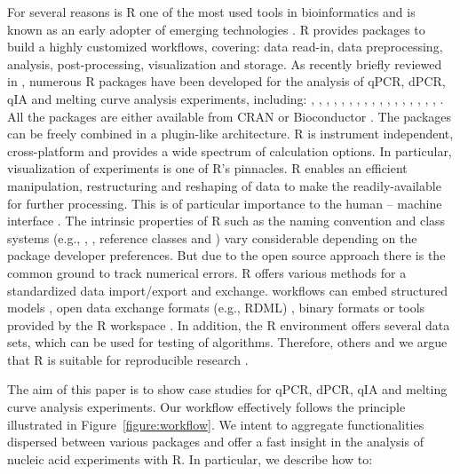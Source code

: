 For several reasons is R one of the most used tools in bioinformatics and is 
known as an early adopter of emerging technologies \citep{pabinger_2014}. R 
provides packages to build a highly customized workflows, covering: data 
read-in, data preprocessing, analysis, post-processing, visualization and 
storage. As recently briefly reviewed in \citet{pabinger_2014}, numerous R 
packages have been developed for the analysis of qPCR, dPCR, qIA and melting 
curve analysis experiments, including: , , 
, , , , 
, , , , 
, , , , 
, , , 
. All the packages are either available from CRAN or 
Bioconductor \citep{gentleman_2004}. The packages can be freely combined in a 
plugin-like architecture. R is instrument independent, cross-platform and 
provides a wide spectrum of calculation options. In particular, visualization of 
experiments is one of R's pinnacles. R enables an 
efficient manipulation, restructuring and reshaping of data to make the 
readily-available for further processing. This is of particular importance to 
the human -- machine interface \citep{Oh_2014}. The intrinsic properties of R 
such as the naming convention \citep{Baaaath_2012} and class systems (e.g., 
, , reference classes and ) vary considerable 
depending on the package developer preferences. But due to the open source 
approach there is the common ground to track numerical errors. R offers various 
methods for a standardized data import/export and exchange. workflows can embed 
structured models \citet{Guazzelli_2009}, open data exchange formats (e.g., RDML) , binary 
formats \citep{michna_2013} or tools provided by the R workspace 
\citep{RDCT2010c}. In addition, the R environment offers several data sets, 
which can be used for testing of algorithms. Therefore, others and we argue that 
R is suitable for reproducible research \citep{Gesmann_2011, Murrell_2012, 
gandrud_2013, hofmann_2013, Leeper_2014, liu_2014}. 

The aim of this paper is to show case studies for qPCR, dPCR, qIA and melting 
curve analysis experiments. Our workflow effectively follows the principle 
illustrated in Figure~\ref{figure:workflow}. We intent to aggregate 
functionalities dispersed between various packages and offer a fast insight in 
the analysis of nucleic acid experiments with R. In particular, we describe how 
to:

